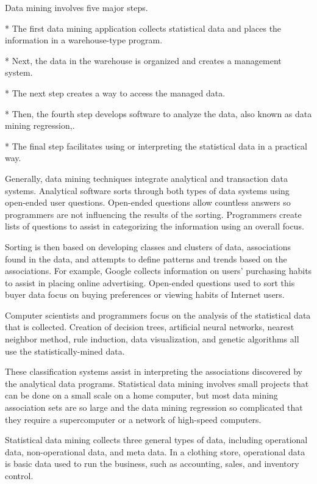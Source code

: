 \begin{description}
Data mining involves five major steps. 

\begin{enumerate}
*  The first data mining application collects statistical data and places the information in a warehouse-type program. 

*  Next, the data in the warehouse is organized and creates a management system. 

*  The next step creates a way to access the managed data. 

*  Then, the fourth step develops software to analyze the data, also known as data mining regression,. 

*  The final step facilitates using or interpreting the statistical data in a practical way.
\end{enumerate}

Generally, data mining techniques integrate analytical and transaction data systems. Analytical software sorts through both types of data systems using open-ended user questions. Open-ended questions allow countless answers so programmers are not influencing the results of the sorting. Programmers create lists of questions to assist in categorizing the information using an overall focus.


Sorting is then based on developing classes and clusters of data, associations found in the data, and attempts to define patterns and trends based on the associations. For example, Google collects information on users' purchasing habits to assist in placing online advertising. Open-ended questions used to sort this buyer data focus on buying preferences or viewing habits of Internet users.


Computer scientists and programmers focus on the analysis of the statistical data that is collected. Creation of decision trees, artificial neural networks, nearest neighbor method, rule induction, data visualization, and genetic algorithms all use the statistically-mined data. 


These classification systems assist in interpreting the associations discovered by the analytical data programs. Statistical data mining involves small projects that can be done on a small scale on a home computer, but most data mining association sets are so large and the data mining regression so complicated that they require a supercomputer or a network of high-speed computers.


Statistical data mining collects three general types of data, including operational data, non-operational data, and meta data. In a clothing store, operational data is basic data used to run the business, such as accounting, sales, and inventory control. 



\end{description}
